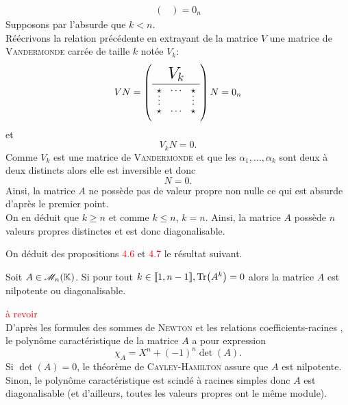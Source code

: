 \begin{preuve}
\begin{itemize}
\begin{align*}
\begin{pmatrix}
            \end{pmatrix}
            =
            0_n
        \end{align*}
        Supposons par l'absurde que $k < n$. \\
        Réécrivons la relation précédente en extrayant de la matrice $V$ une matrice de \textsc{Vandermonde} carrée de taille $k$ notée $V_k$:
        $$V N = \vandermondepartiel N = 0_n$$
        et
        $$V_k N = 0.$$
        Comme $V_k$ est une matrice de \textsc{Vandermonde} et que les $\alpha_1, \dots, \alpha_k$ sont deux à deux distincts alors elle est inversible et donc
        $$N = 0.$$
        Ainsi, la matrice $A$ ne possède pas de valeur propre non nulle ce qui est absurde d'après le premier point. \\
        On en déduit que $k \geqslant n$ et comme $k \leqslant n$, $k=n$. Ainsi, la matrice $A$ possède $n$ valeurs propres distinctes et est donc diagonalisable.
    \end{itemize}
\end{preuve}

On déduit des propositions \textcolor{red}{4.6} et \textcolor{red}{4.7} le résultat suivant.
\begin{prop}{}
    Soit $A \in \mathscr{M}_n(\mathbb{K})$. Si pour tout $k \in \llbracket 1, n-1 \rrbracket, \Tr(A^k) = 0$ alors la matrice $A$ est nilpotente ou diagonalisable.
\end{prop}


\begin{preuve}
    \textcolor{red}{à revoir} \\
    D'après les formules des sommes de \textsc{Newton} et les relations coefficients-racines
    , le polynôme caractéristique de la matrice $A$ a pour expression
    $$\chi_A = X^n + (-1)^n \det(A).$$
    Si $\det(A) = 0$, le théorème de \textsc{Cayley}-\textsc{Hamilton} assure que $A$ est nilpotente. Sinon, le polynôme caractéristique est scindé à racines simples donc $A$ est diagonalisable (et d'ailleurs, toutes les valeurs propres ont le même module).
\end{preuve}
